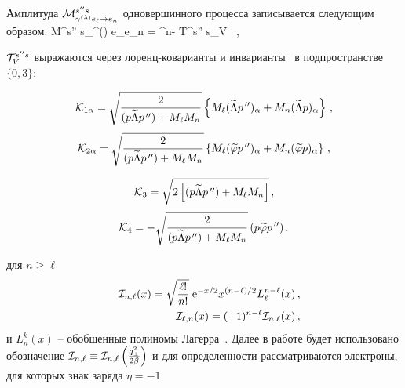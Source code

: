 Амплитуда ${\cal M}^{s'' s}_{\gamma^{(\lambda)} e_\ell \to e_n}$ одновершинного процесса записывается следующим образом:
%
\beq
\label{eq:amplonever} 
{\cal M}^{s'' s}_{\gamma^{(\lambda)} e_\ell \to e_n} =   
^{n-\ell} {\cal T}^{s'' s}_{V} \, ,
\eeq

${\cal T}^{s'' s}_{V}$ выражаются через  
лоренц-коварианты и инварианты~  в подпространстве~$\{0, 3\}$:

\begin{equation}
	\label{eq:K1}
	{\cal K}_{1\alpha} = \sqrt{\frac{2}{(p\widetilde \Lambda p^{\, \prime \prime}) + 
			M_\ell M_{n}}} \left \{M_\ell (\widetilde \Lambda p^{\, \prime \prime})_\alpha + 
	M_{n} (\widetilde \Lambda p)_\alpha  \right \}\, ,
\end{equation}
%
\begin{equation}
	{\cal K}_{2\alpha} = \sqrt{\frac{2}{(p\widetilde \Lambda p^{\, \prime \prime}) + 
			M_\ell M_{n}}} \left \{M_\ell (\widetilde \varphi p^{\, \prime \prime})_\alpha + 
	M_{n} (\widetilde \varphi p)_\alpha  \right \}\, ,
	\label{eq:K2}
\end{equation}

\begin{equation}
	\label{eq:K3}
	{\cal K}_{3} = \sqrt{2\left [(p\widetilde \Lambda p^{\, \prime \prime}) + 
		M_\ell M_{n} \right]} \, ,  
\end{equation}
%
\begin{equation}
	\label{eq:K4}
	{\cal K}_4 = 
	- \sqrt{\frac{2}{(p\widetilde \Lambda p^{\, \prime \prime}) + M_\ell M_{n}}}\, 
	(p\widetilde \varphi p^{\, \prime \prime}) \, .
\end{equation}

для $n \geqslant \ell$
%
\begin{eqnarray}
	\nonumber
	&&{\cal I}_{n, \ell} (x) = \sqrt{\frac{\ell !}{n !}} \; \mathrm{e}^{-x/2} x^{(n-\ell)/2} L_\ell^{n-\ell} (x) \, ,
	\\
	&&{\cal I}_{\ell, n} (x) = (-1)^{n-\ell} {\cal I}_{n, \ell} (x) \, ,
	\label{eq:Inl}
\end{eqnarray}
\noindent и $L^k_n (x)$ -- обобщенные полиномы Лагерра~\cite{Gradstein:1963}.
Далее в работе будет использовано обозначение ${\cal I}_{n, \ell}\equiv{\cal I}_{n, \ell} \left(\frac{q_\perp^2}{2\beta}\right)$ и для определенности рассматриваются электроны, для которых знак заряда $\eta=-1$.

